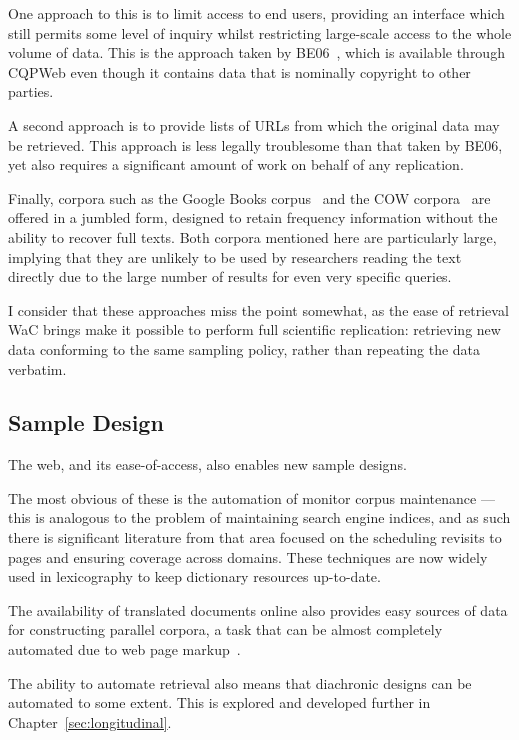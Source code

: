 One approach to this is to limit access to end users, providing an interface which still permits some level of inquiry whilst restricting large-scale access to the whole volume of data.  This is the approach taken by BE06~\cite{baker2009be06}, which is available through CQPWeb even though it contains data that is nominally copyright to other parties.

A second approach is to provide lists of URLs from which the original data may be retrieved.  This approach is less legally troublesome than that taken by BE06, yet also requires a significant amount of work on behalf of any replication.

Finally, corpora such as the Google Books corpus~\cite{goldberg2013dataset} and the COW corpora~\cite{schafer2012building} are offered in a jumbled form, designed to retain frequency information without the ability to recover full texts.  Both corpora mentioned here are particularly large, implying that they are unlikely to be used by researchers reading the text directly due to the large number of results for even very specific queries.


I consider that these approaches miss the point somewhat, as the ease of retrieval WaC brings make it possible to perform full scientific replication: retrieving new data conforming to the same sampling policy, rather than repeating the data verbatim.



\subsection{Sample Design}
The web, and its ease-of-access, also enables new sample designs.

The most obvious of these is the automation of monitor corpus maintenance --- this is analogous to the problem of maintaining search engine indices, and as such there is significant literature from that area focused on the scheduling revisits to pages and ensuring coverage across domains.  These techniques are now widely used in lexicography to keep dictionary resources up-to-date.

The availability of translated documents online also provides easy sources of data for constructing parallel corpora, a task that can be almost completely automated due to web page markup~\cite{resnik2003web}.

The ability to automate retrieval also means that diachronic designs can be automated to some extent.  This is explored and developed further in Chapter~\ref{sec:longitudinal}.

